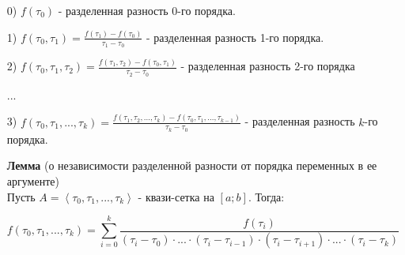 \documentclass[__main__.tex]{subfiles}
\begin{document}
\begin{itemize}
\item[0)] $f(\tau_0)$ - разделенная разность 0-го порядка.
\item[1)] $f(\tau_0, \tau_1) = \frac{f(\tau_1) - f(\tau_0)}{\tau_1 - \tau_0}$ - разделенная разность 1-го порядка.
\item[2)] $f(\tau_0, \tau_1, \tau_2) = \frac{f(\tau_1, \tau_2) - f(\tau_0, \tau_1)}{\tau_2 - \tau_0}$ - разделенная разность 2-го порядка
\item[...]
\item[3)] $f(\tau_0, \tau_1, \text{...}, \tau_k) = \frac{f(\tau_1, \tau_2, \text{...}, \tau_k) - f(\tau_0, \tau_1, \text{...}, \tau_{k-1})}{\tau_k - \tau_0}$ - разделенная разность $k$-го порядка.

\textbf{Лемма} (о независимости разделенной разности от порядка переменных в ее аргументе)\\
Пусть $A = \left<\tau_0, \tau_1, \text{...}, \tau_k\right>$ - квази-сетка на $[a;b]$. Тогда:

$$f(\tau_0, \tau_1, \text{...}, \tau_k) = \sum_{i = 0}^k \frac{f(\tau_i)}{(\tau_i - \tau_0) \cdot \text{...} \cdot (\tau_i - \tau_{i - 1}) \cdot (\tau_i - \tau_{i+1}) \cdot \text{...} \cdot (\tau_i - \tau_k)}$$
 
\end{itemize}
\end{document}
